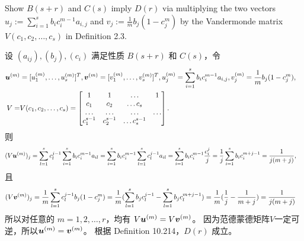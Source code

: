 \documentclass[lang=cn,a4paper,newtx,bibend=bibtex]{elegantpaper}
\begin{document}
\newpage 
\begin{prob}[Exercise 10.216]
  Show $B(s+r)$ and $C(s)$ imply $D(r)$ via multiplying the two vectors
  $u_j := \sum_{i=1}^s b_ic_i^{m-1}a_{i,j}$ and $v_j := \frac 1m b_j(1-c_j^m)$
  by the Vandermonde matrix $V(c_1,c_2,\dots,c_s)$ in Definition 2.3.
\end{prob}

\begin{solution}
  设 $(a_{ij}),(b_j),(c_i)$ 满足性质 $B(s+r)$ 和 $C(s)$，令
  \begin{equation*}
    \begin{aligned}
      \bm{u}^{(m)} & = [u_1^{(m)}, \dots, u_s^{(m)}]^T, 
      \bm{v}^{(m)} = [v_1^{(m)}, \dots, v_s^{(m)}]^T, 
      u_j^{(m)} = \sum_{i=1}^s b_ic_i^{m-1}a_{i,j},
      v_j^{(m)} = \frac 1m b_j(1-c_j^m), & \\
      V = & V(c_1,c_2,\dots,c_s) =
      \begin{bmatrix}
        1 & 1 & \dots & 1 \\
        c_1 & c_2 & \dots c_s \\
        \dots & \dots & \dots & \dots \\
        c_1^{s-1} & c_2^{s-1} & \dots c_s^{s-1} \\
      \end{bmatrix}. &
    \end{aligned}
  \end{equation*}
  则
  \begin{equation*}
    \begin{aligned}
      & (V\bm{u}^{(m)})_j 
      = \sum_{l=1}^s c_l^{j-1}\sum_{i=1}^s b_ic_i^{m-1}a_{il}
      = \sum_{i=1}^s b_ic_i^{m-1}\sum_{l=1}^s c_l^{j-1}a_{il}
      = \sum_{i=1}^s b_ic_i^{m-1}\frac{c_i^j}{j}
      = \frac 1j\sum_{i=1}^s b_ic_i^{m+j-1}
      = \frac 1{j(m+j)} ,
    \end{aligned}
  \end{equation*}
  且
  \begin{equation*}
    \begin{aligned}
      & (V\bm{v}^{(m)})_j 
      = \frac 1m\sum_{l=1}^s c_l^{j-1}b_j(1-c_j^m) 
      = \frac 1m(\sum_{l=1}^s b_jc_l^{j-1} - \sum_{l=1}^s b_jc_l^{m+j-1}) 
      = \frac 1m(\frac 1j - \frac 1{m+j}) 
      = \frac 1{j(m+j)}
    \end{aligned}
  \end{equation*}
  所以对任意的 $m=1,2,\dots,r$，均有 $V\bm{u}^{(m)} = V\bm{v}^{(m)}$。
  因为范德蒙德矩阵$V$一定可逆，所以$\bm{u}^{(m)} = \bm{v}^{(m)}$。
  根据 Definition 10.214，$D(r)$ 成立。
\end{solution}
\end{document}
